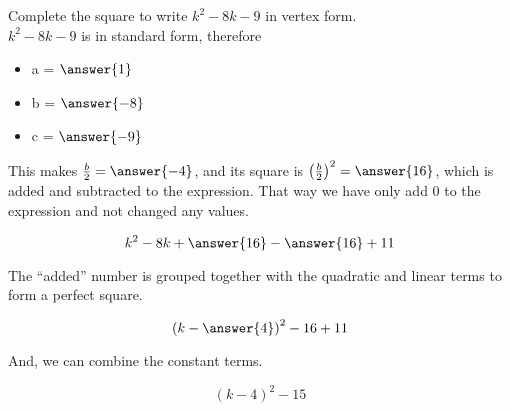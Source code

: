 \documentclass{ximera}
\author{Lee Wayand}
\begin{document}
\begin{exercise} 


Complete the square to write $k^2 - 8k - 9$ in vertex form. \\



$k^2 - 8k - 9$ is in standard form, therefore



\begin{itemize}
\item  a = $\answer{1}$ \\
\item  b = $\answer{-8}$ \\
\item  c = $\answer{-9}$ \\
\end{itemize}



This makes $\frac{b}{2} = \answer{-4}$, and its square is $\left( \frac{b}{2} \right)^2 = \answer{16}$, which is added and subtracted to the expression.  That way we have only add $0$ to the expression and not changed any values. 


\[ k^2 - 8k + \answer{16} - \answer{16} + 11 \]



The ``added'' number is grouped together with the quadratic and linear terms to form a perfect square.



\[ \left( k - \answer{4} \right)^2  - 16 + 11 \]

And, we can combine the constant terms.



\[  ( k - 4 )^2  - 15  \]



\end{exercise}
\end{document}
